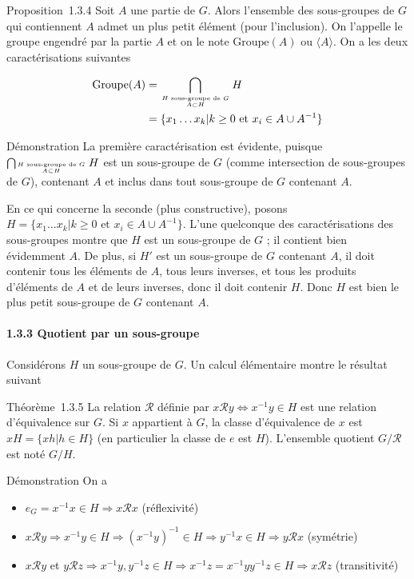 Proposition~1.3.4 Soit $A$ une partie de $G$. Alors l'ensemble des
sous-groupes de $G$ qui contiennent $A$ admet un plus petit élément (pour
l'inclusion). On l'appelle le groupe engendré par la partie $A$ et on le
note $\text{Groupe}(A)$ ou $\langle A \rangle$. On a les deux caractérisations suivantes

\begin{align*} 
\text{Groupe}(A) &= \bigcap_{H \text{ sous-groupe de } G \atop A \subset H} H \\
&= \{x_1 \ldots x_k | k \geq 0 \text{ et } x_i \in A \cup A^{-1}\}
\end{align*}

Démonstration La première caractérisation est évidente, puisque
$\bigcap_{H \text{ sous-groupe de } G \atop A \subset H} H$ est un sous-groupe de $G$ (comme intersection de sous-groupes de $G$),
contenant $A$ et inclus dans tout sous-groupe de $G$ contenant $A$.

En ce qui concerne la seconde (plus constructive), posons $H =
\{x_1 \ldots x_k | k \geq 0 \text{ et } x_i \in A \cup A^{-1}\}$. L'une quelconque des caractérisations
des sous-groupes montre que $H$ est un sous-groupe de $G$ ; il contient bien
évidemment $A$. De plus, si $H'$ est un sous-groupe de $G$ contenant $A$, il
doit contenir tous les éléments de $A$, tous leurs inverses, et tous les
produits d'éléments de $A$ et de leurs inverses, donc il doit contenir $H$.
Donc $H$ est bien le plus petit sous-groupe de $G$ contenant $A$.

\paragraph{1.3.3 Quotient par un sous-groupe}

Considérons $H$ un sous-groupe de $G$. Un calcul élémentaire montre le
résultat suivant

Théorème~1.3.5 La relation $\mathcal{R}$ définie par $x \mathcal{R} y
\Leftrightarrow x^{-1}y \in H$ est une relation
d'équivalence sur $G$. Si $x$ appartient à $G$, la classe d'équivalence de $x$
est $xH = \{xh | h \in H\}$ (en particulier la classe de $e$ est $H$). L'ensemble
quotient $G/\mathcal{R}$ est noté $G/H$.

Démonstration On a

\begin{itemize}
\itemsep1pt\parskip0pt
\item
  $e_G = x^{-1}x \in H \Rightarrow x \mathcal{R} x$ (réflexivité)
\item
  $x \mathcal{R} y \Rightarrow x^{-1}y \in H \Rightarrow (x^{-1}y)^{-1} \in H \Rightarrow y^{-1}x \in H \Rightarrow y \mathcal{R} x$ (symétrie)
\item
  $x \mathcal{R} y$ et $y \mathcal{R} z \Rightarrow x^{-1}y, y^{-1}z \in H \Rightarrow x^{-1}z = x^{-1}y y^{-1}z \in H \Rightarrow x \mathcal{R} z$ (transitivité)
\end{itemize}

